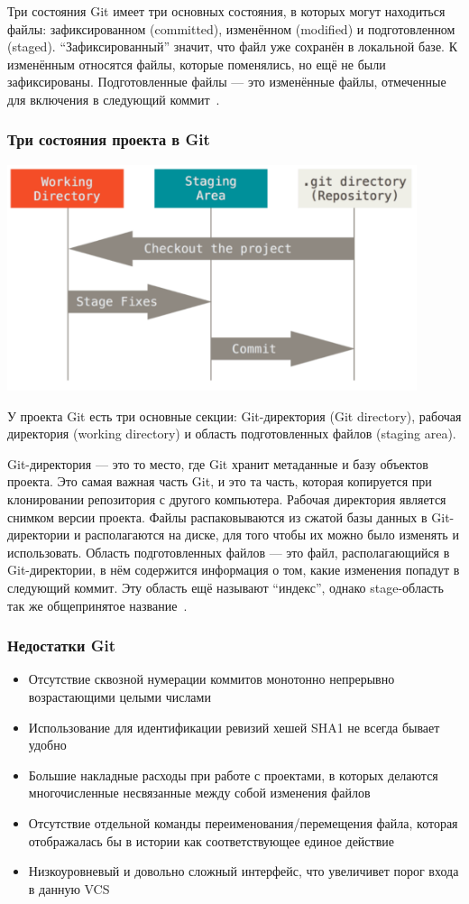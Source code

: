 \documentclass{../industrial-development}
\begin{document}
Три состояния
Git имеет три основных состояния, в которых могут находиться файлы: зафиксированном (committed), изменённом (modified) и подготовленном (staged). “Зафиксированный” значит, что файл уже сохранён в локальной базе. К изменённым относятся файлы, которые поменялись, но ещё не были зафиксированы. Подготовленные файлы — это изменённые файлы, отмеченные для включения в следующий коммит~\cite[с.~8-10]{ProGit}.

\begin{frame} \frametitle{Три состояния проекта в Git}
  \centerline{\includegraphics[width=0.9\textwidth]{GitSections.pdf}}
\end{frame}

\lecturenotes

У проекта Git есть три основные секции: Git-директория (Git directory), рабочая директория (working directory) и область подготовленных файлов (staging area).

Git-директория --- это то место, где Git хранит метаданные и базу объектов проекта. Это самая важная часть Git, и это та часть, которая копируется при клонировании репозитория с другого компьютера.
Рабочая директория является снимком версии проекта. Файлы распаковываются из сжатой базы данных в Git-директории и располагаются на диске, для того чтобы их можно было изменять и использовать.
Область подготовленных файлов — это файл, располагающийся в Git-директории, в нём содержится информация о том, какие изменения попадут в следующий коммит. Эту область ещё называют “индекс”, однако stage-область так же общепринятое название~\cite[с.~11]{ProGit}.

\begin{frame} \frametitle{Недостатки Git}
  
  \begin{itemize}
  \item Отсутствие сквозной нумерации коммитов монотонно непрерывно возрастающими целыми числами
  \item Использование для идентификации ревизий хешей SHA1 не всегда бывает удобно
  \item Большие накладные расходы при работе с проектами, в которых делаются многочисленные несвязанные между собой изменения файлов
  \item Отсутствие отдельной команды переименования/перемещения файла, которая отображалась бы в истории как соответствующее единое действие
  \item Низкоуровневый и довольно сложный интерфейс, что увеличивет порог входа в данную VCS
  \end{itemize}
\end{frame}
\end{document}
